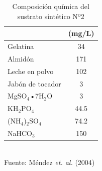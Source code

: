 	\begin{table}[!h]
	\caption{Composición química del sustrato sintético Nº2}
	\label{tab:sustrato}
	\begin{center}
	\begin{scriptsize}
	\begin{tabular}{|l|c|}
		\hline
		\rowcolor{blanc}
		\multicolumn{1}{|c|}{\textbf{Compuestos}} & \textbf{(mg/L)}\\ \hline
		Gelatina & 34\\
		Almidón & 171\\
		Leche en polvo & 102\\
		Jabón de tocador & 3\\
		MgSO$_{4}$•7H$_{2}$O & 3\\
		KH$_{2}$PO$_{4}$ & 44.5\\
		(NH$_{4}$)$_{2}$SO$_{4}$ & 74.2\\
		NaHCO$_{3}$ & 150\\ \hline
	\end{tabular}
	\end{scriptsize}
	\\ \small{Fuente: Méndez \textit{et. al.} (2004)}
	\end{center}
	\end{table}
